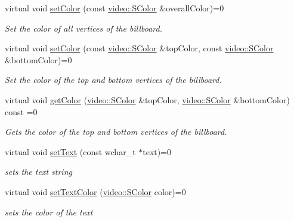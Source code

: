 \begin{DoxyCompactItemize}
virtual void \hyperlink{classirr_1_1scene_1_1IBillboardTextSceneNode_aaa65d10d3a49206728c47b148a64bb4a}{set\+Color} (const \hyperlink{classirr_1_1video_1_1SColor}{video\+::\+S\+Color} \&overall\+Color)=0
\begin{DoxyCompactList}\small\item\em Set the color of all vertices of the billboard. \end{DoxyCompactList}\item 
virtual void \hyperlink{classirr_1_1scene_1_1IBillboardTextSceneNode_ab3faa7c4238acd6bc3a2330cb5650da5}{set\+Color} (const \hyperlink{classirr_1_1video_1_1SColor}{video\+::\+S\+Color} \&top\+Color, const \hyperlink{classirr_1_1video_1_1SColor}{video\+::\+S\+Color} \&bottom\+Color)=0
\begin{DoxyCompactList}\small\item\em Set the color of the top and bottom vertices of the billboard. \end{DoxyCompactList}\item 
virtual void \hyperlink{classirr_1_1scene_1_1IBillboardTextSceneNode_ac142a04e455811d5a3efa47ce2499d18}{get\+Color} (\hyperlink{classirr_1_1video_1_1SColor}{video\+::\+S\+Color} \&top\+Color, \hyperlink{classirr_1_1video_1_1SColor}{video\+::\+S\+Color} \&bottom\+Color) const =0
\begin{DoxyCompactList}\small\item\em Gets the color of the top and bottom vertices of the billboard. \end{DoxyCompactList}\item 
\mbox{\label{classirr_1_1scene_1_1IBillboardTextSceneNode_ab404347cd57f64bb559cca8bed8caa53}} 
virtual void \hyperlink{classirr_1_1scene_1_1IBillboardTextSceneNode_ab404347cd57f64bb559cca8bed8caa53}{set\+Text} (const wchar\+\_\+t $\ast$text)=0
\begin{DoxyCompactList}\small\item\em sets the text string \end{DoxyCompactList}\item 
\mbox{\label{classirr_1_1scene_1_1IBillboardTextSceneNode_a05e1db5ef9af3ff0ab2750ba584583ef}} 
virtual void \hyperlink{classirr_1_1scene_1_1IBillboardTextSceneNode_a05e1db5ef9af3ff0ab2750ba584583ef}{set\+Text\+Color} (\hyperlink{classirr_1_1video_1_1SColor}{video\+::\+S\+Color} color)=0
\begin{DoxyCompactList}\small\item\em sets the color of the text \end{DoxyCompactList}\end{DoxyCompactItemize}

